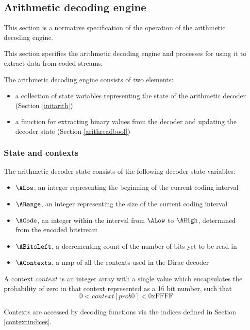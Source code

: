 \subsection{Arithmetic decoding engine}
\label{arithengine}

This section is a normative specification of the operation of the arithmetic
decoding engine.



This section specifies the arithmetic decoding engine and
processes for using it to extract data from coded streams.

The arithmetic decoding engine consists of two elements: 

\begin{itemize}
\item a collection of state variables representing the state of the arithmetic 
decoder (Section \ref{initarith})
\item a function for extracting binary values from the decoder 
and updating the decoder state (Section \ref{arithreadbool})
\end{itemize}

\subsubsection{State and contexts}
\label{arithcontexts}

The arithmetic decoder state consists of the following decoder state variables:

\begin{itemize}
\item $\ALow$, an integer representing the beginning of the current coding interval
\item $\ARange$, an integer representing the size of the current coding interval
\item $\ACode$, an integer within the interval from $\ALow$ to $\AHigh$, determined from the encoded bitstream
\item $\ABitsLeft$, a decrementing count of the number of bits yet to be read in
\item $\AContexts$, a map of all the contexts used in the Dirac decoder
\end{itemize}

A context $context$ is an integer array with a single value which encapsulates
the probability of zero in that context represented as a 16 bit number, such that
\[0<context[prob0]<\text{0xFFFF}\]

Contexts are accessed by decoding functions via the indices defined in Section \ref{contextindices}. 


